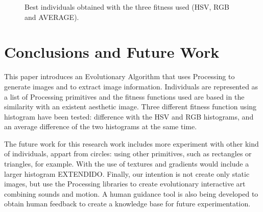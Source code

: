 \documentclass[conference]{IEEEtran}
\begin{document}
\begin{figure}[ht]
{   \label{fig:subfig1}
 }
\label{fig:bestinds}
\caption{Best individuals obtained with the three fitness used (HSV, RGB and AVERAGE). }
\end{figure}


\section{Conclusions and Future Work}
\label{sec:conclusions}
This paper introduces an Evolutionary Algorithm that uses Processing to generate images and to extract image information. Individuals are represented as a list of Processing primitives and the fitness functions used are based in the similarity with an existent aesthetic image. Three different fitness function using histogram have been tested: difference with the HSV and RGB histograms, and an average difference of the two histograms at the same time.

The future work for this research work includes more experiment with other kind of individuals, appart from circles: using other primitives, such as rectangles or triangles, for example. With the use of textures and gradients would include a larger histogram EXTENDIDO. Finally, our intention is not create only static images, but use the Processing libraries to create evolutionary interactive art combining sounds and motion. A human guidance tool is also being developed to obtain human feedback to create a knowledge base for future experimentation.
\end{document}
